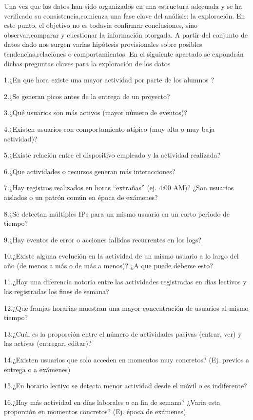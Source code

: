 \documentclass[notspecified,article,submit,moreauthors,pdftex]{Definitions/mdpi}
\begin{document}
Una vez que los datos han sido organizados en una estructura adecuada y
se ha verificado su consistencia,comienza una fase clave del análisis:
la exploración. En este punto, el objetivo no es todavia confirmar
conclusiones, sino observar,comparar y cuestionar la información
otorgada. A partir del conjunto de datos dado nos surgen varias
hipótesis provisionales sobre posibles tendencias,relaciones o
comportamientos. En el siguiente apartado se expondrán dichas preguntas
claves para la exploración de los datos

1.¿En que hora existe una mayor actividad por parte de los alumnos ?

2.¿Se generan picos antes de la entrega de un proyecto?

3.¿Qué usuarios son más activos (mayor número de eventos)?

4.¿Existen usuarios con comportamiento atípico (muy alta o muy baja
actividad)?

5.¿Existe relación entre el dispositivo empleado y la actividad
realizada?

6.¿Que actividades o recursos generan más interacciones?

7.¿Hay registros realizados en horas ``extrañas'' (ej. 4:00 AM)? ¿Son
usuarios aislados o un patrón común en época de exámenes?

8.¿Se detectan múltiples IPs para un mismo usuario en un corto periodo
de tiempo?

9.¿Hay eventos de error o acciones fallidas recurrentes en los logs?

10.¿Existe alguna evolución en la actividad de un mismo usuario a lo
largo del año (de menos a más o de más a menos)? ¿A que puede deberse
esto?

11.¿Hay una diferencia notoria entre las actividades registradas en dias
lectivos y las registradas los fines de semana?

12.¿Que franjas horarias muestran una mayor concentración de usuarios al
mismo tiempo?

13.¿Cuál es la proporción entre el número de actividades pasivas
(entrar, ver) y las activas (entregar, editar)?

14.¿Existen usuarios que solo acceden en momentos muy concretos? (Ej.
previos a entrega o a exámenes)

15.¿En horario lectivo se detecta menor actividad desde el móvil o es
indiferente?

16.¿Hay más actividad en días laborales o en fin de semana? ¿Varia esta
proporción en momentos concretos? (Ej. época de exámenes)
\end{document}
